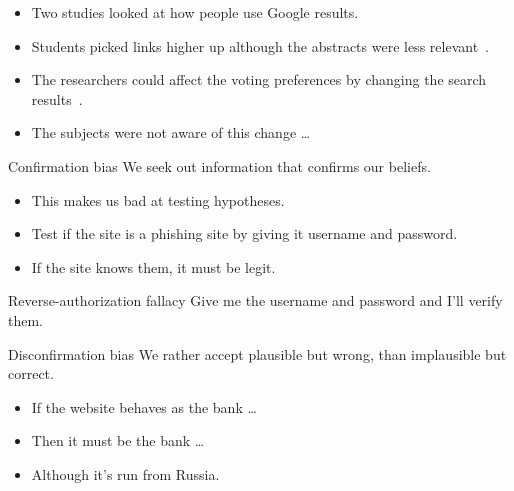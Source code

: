 \begin{frame}
  \begin{example}
    \begin{itemize}
      \item Two studies looked at how people use Google results.

      \item Students picked links higher up although the abstracts were less 
        relevant~\cite{Pan2007igw}.

      \item The researchers could affect the voting preferences by changing the 
        search results~\cite{Epstein2013dar}.

      \item The subjects were not aware of this change \dots
    \end{itemize}
  \end{example}
\end{frame}

\begin{frame}
  \begin{block}{Confirmation bias}
    We seek out information that confirms our beliefs.
  \end{block}

  \pause

  \begin{example}
    \begin{itemize}
      \item This makes us bad at testing hypotheses.
      \item Test if the site is a phishing site by giving it username and 
        password.
      \item If the site knows them, it must be legit.
    \end{itemize}
  \end{example}

  \pause

  \begin{remark}{Reverse-authorization fallacy}
    Give me the username and password and I'll verify them.
  \end{remark}
\end{frame}

\begin{frame}
  \begin{block}{Disconfirmation bias}
    We rather accept plausible but wrong, than implausible but correct.
  \end{block}

  \pause

  \begin{example}
    \begin{itemize}
      \item If the website behaves as the bank \dots
      \item Then it must be the bank \dots
      \item Although it's run from Russia.
    \end{itemize}
  \end{example}
\end{frame}

